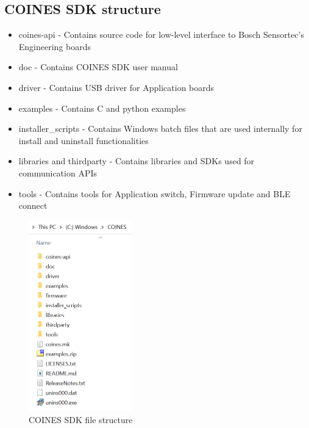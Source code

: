 \documentclass{article}
\begin{document}
\subsection{COINES SDK structure}
\begin{itemize}
	\item coines-api - Contains source code for low-level interface to Bosch Sensortec’s Engineering boards
	\item doc - Contains COINES SDK user manual
	\item driver - Contains USB driver for Application boards
	\item examples - Contains C and python examples 
	\item installer\_scripts - Contains Windows batch files that are used internally for install and uninstall functionalities
	\item libraries and thirdparty - Contains libraries and SDKs used for communication APIs
	\item tools - Contains tools for Application switch, Firmware update and BLE connect
\end{itemize}
\begin{figure}[H]
	\begin{center}
		\includegraphics[width=0.4\textwidth]{coinesAPI_images/COINES_file_structure.png}
		\caption{COINES SDK file structure}
	\end{center}
\end{figure}
\bstlastpage
\end{document}

